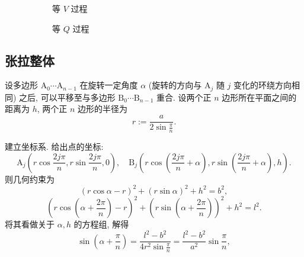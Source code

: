 \documentclass{article}
\begin{document}
\begin{figure}[h!]
	\centering
	\begin{subfigure}[b]{0.4\linewidth}
		\centering
		\caption{等 $V$ 过程}
		\label{fig:等V过程}
	\end{subfigure}
	\begin{subfigure}[b]{0.4\linewidth}
		\centering
		\caption{等 $Q$ 过程}
		\label{fig:等Q过程}
	\end{subfigure}
	\caption{}
	\label{fig:电容势函数的图}
\end{figure}

\subsection{张拉整体}

设多边形 $\mathrm A_0\cdots\mathrm A_{n-1}$ 在旋转一定角度 $\alpha$
(旋转的方向与 $\mathrm A_j$ 随 $j$ 变化的环绕方向相同) 之后,
可以平移至与多边形 $\mathrm B_0\cdots\mathrm B_{n-1}$ 重合.
设两个正 $n$ 边形所在平面之间的距离为 $h$,
两个正 $n$ 边形的半径为
\begin{equation}
	r:=\frac a{2\sin\frac\pi n}.
\end{equation}

建立坐标系. 给出点的坐标:
\begin{equation}
	\mathrm A_j\left(r\cos\frac{2j\pi}n,r\sin\frac{2j\pi}n,0\right),
	\quad\mathrm B_j\left(r\cos\!\left(\frac{2j\pi}n+\alpha\right),r\sin\!\left(\frac{2j\pi}n+\alpha\right),h\right).
\end{equation}
则几何约束为
\begin{equation}
	\left(r\cos\alpha-r\right)^2+\left(r\sin\alpha\right)^2+h^2=b^2,
\end{equation}
\begin{equation}
	\left(r\cos\!\left(\alpha+\frac{2\pi}n\right)-r\right)^2
	+\left(r\sin\!\left(\alpha+\frac{2\pi}n\right)\right)^2+h^2=l^2.
\end{equation}
将其看做关于 $\alpha,h$ 的方程组, 解得
\begin{equation}
	\sin\!\left(\alpha+\frac\pi n\right)
	=\frac{l^2-b^2}{4r^2\sin\frac\pi n}
	=\frac{l^2-b^2}{a^2}\sin\frac\pi n,
	\label{eq:几何约束三角方程}
\end{equation}
\end{document}
